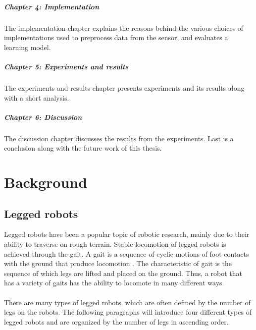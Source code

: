 \documentclass[USenglish]{ifimaster}  %
\begin{document}
\paragraph{Chapter 4: Implementation}
The implementation chapter explains the reasons behind the various choices of implementations used to preprocess data from the sensor, and evaluates a learning model.
	
\paragraph{Chapter 5: Experiments and results}
The experiments and results chapter presents experiments and its results along with a short analysis.
	
\paragraph{Chapter 6: Discussion}
The discussion chapter discusses the results from the experiments. Last is a conclusion along with the future work of this thesis.
	
\chapter{Background}                  %


\section{Legged robots}
Legged robots have been a popular topic of robotic research, mainly due to their ability to traverse on rough terrain. Stable locomotion of legged robots is achieved through the gait. A gait is a sequence of cyclic motions of foot contacts with the ground that produce locomotion \cite{1641859}. The characteristic of gait is the sequence of which legs are lifted and placed on the ground. Thus, a robot that has a variety of gaits has the ability to locomote in many different ways.
\\
\\
There are many types of legged robots, which are often defined by the number of legs on the robots. The following paragraphs will introduce four different types of legged robots and are organized by the number of legs in ascending order.
\end{document}
